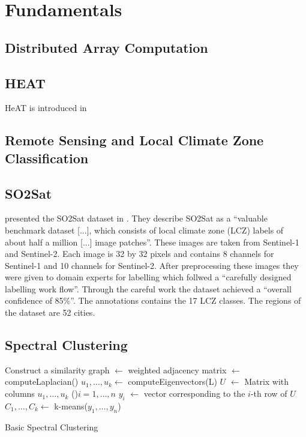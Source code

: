 \section{Fundamentals}
\label{sec:fundamentals}

\subsection{Distributed Array Computation}
\label{ssec:distributed_array_computation}


\subsection{HEAT}
\label{ssec:heat}
\gls{HeAT} is introduced in \cite{krajsek_helmholtz_nodate}

\subsection{Remote Sensing and Local Climate Zone Classification}
\label{ssec:remote_sensing_and_local_climate_zone_classification}

\subsection{SO2Sat}
\citeauthor{zhu_so2sat_2019} presented the SO2Sat dataset in \cite{zhu_so2sat_2019}. They describe SO2Sat as a \enquote{valuable benchmark dataset [...], which consists of local climate zone (LCZ) labels of about half a million [...] image patches}.
These images are taken from Sentinel-1 and Sentinel-2. Each image is 32 by 32 pixels and contains 8 channels for Sentinel-1 and 10 channels for Sentinel-2.
After preprocessing these images they were given to domain experts for labelling which follwed a \enquote{carefully designed labelling work flow}.
Through the careful work the dataset achieved a \enquote{overall confidence of 85\%}.
The annotations contains the 17 LCZ classes.
The regions of the dataset are 52 cities.

\subsection{Spectral Clustering}
\label{ssec:spectral_clustering}

\begin{algorithm}[ht]
  Construct a similarity graph\;
  \Adj \(\leftarrow\) weighted adjacency matrix\;
  \Laplace \(\leftarrow\) computeLaplacian(\Adj)\;
  \(u_1, \ldots, u_k \leftarrow\) computeEigenvectors(L)\;
  \(U\) \(\leftarrow\) Matrix with columns \(u_1, \ldots, u_k\)\;
  \ForEach(){\(i = 1, \ldots, n\)}{
    \(y_i\) \(\leftarrow\) vector corresponding to the \(i\)-th row of \(U\)
  }
\(C_1, \ldots, C_k \leftarrow\) k-means(\(y_1, \ldots, y_n\))\;

  \caption{Basic Spectral Clustering}\label{alg:basic_spectral}
 \end{algorithm}

